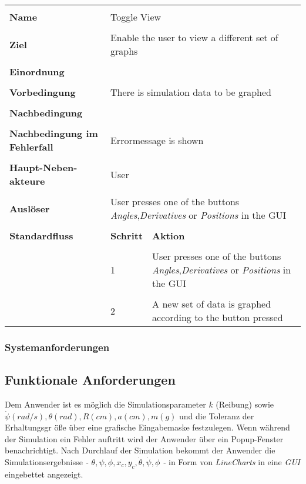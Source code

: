 {\begin{tabular}{|p{5cm}|p{2cm}|p{3cm}|}
\hline \\
\textbf{Name} & \multicolumn{2}{p{5cm}|}{Toggle View} \\
\hline \\
\textbf{Ziel} & \multicolumn{2}{p{5cm}|}{Enable the user to view a different set of graphs} \\
\hline \\
\textbf{Einordnung} & \multicolumn{2}{p{5cm}|}{} \\
\hline \\
\textbf{Vorbedingung} & \multicolumn{2}{p{5cm}|}{There is simulation data to be graphed} \\
\hline \\
\textbf{Nachbedingung} & \multicolumn{2}{p{5cm}|}{} \\
\hline \\
\textbf{Nachbedingung im Fehlerfall} & \multicolumn{2}{p{5cm}|}{Errormessage is shown}\\
\hline \\
\textbf{Haupt-Neben-akteure} & \multicolumn{2}{p{5cm}|}{User} \\
\hline \\
\textbf{Ausl\"oser} & \multicolumn{2}{p{5cm}|}{User presses one of the buttons \textit{Angles},\textit{Derivatives} or \textit{Positions} in the GUI} \\
\hline \\
\textbf{Standardfluss} & \textbf{Schritt}& \textbf{Aktion} \\
\hline \\
& 1 & User presses one of the buttons \textit{Angles},\textit{Derivatives} or \textit{Positions} in the GUI\\
\hline \\
& 2 & A new set of data is graphed according to the button pressed \\
\hline
\end{tabular}

\subsubsection*{Systemanforderungen}
\subsection*{Funktionale Anforderungen}

{Dem Anwender ist es m\"oglich die Simulationsparameter $k$ (Reibung) sowie 
$ \dot \psi (rad/s), \theta (rad), R (cm), a (cm), m (g)$ und die Toleranz der Erhaltungsgr \"o\ss e  \"uber eine grafische Eingabemaske festzulegen. 
Wenn w\"ahrend der Simulation ein Fehler auftritt wird der Anwender 
\"uber ein Popup-Fenster benachrichtigt. Nach Durchlauf der Simulation
bekommt der Anwender die Simulationsergebnisse 
\textit{ - $\theta, \psi, \phi, x_c, y_c, \dot \theta, \dot \psi, 
\phi$ -} in Form von \textit{LineCharts} in eine \textit{GUI} 
eingebettet angezeigt.} 

}
